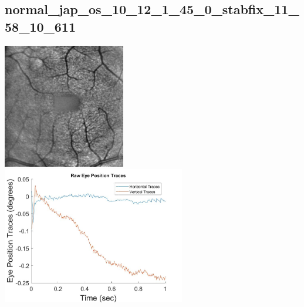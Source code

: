 \documentclass[11pt]{article}
\begin{document}
\subsection{normal\_jap\_os\_10\_12\_1\_45\_0\_stabfix\_11\_58\_10\_611}
\includegraphics[width=0.40\textwidth, valign=m]{referenceframes/tslo_normal/normal_jap_os_10_12_1_45_0_stabfix_11_58_10_611_dwt_nostim_gamscaled_bandfilt_refframe.jpg}
\includegraphics[width=0.60\textwidth, valign=m]{eyepositiontraces/tslo_normal/normal_jap_os_10_12_1_45_0_stabfix_11_58_10_611.jpg}\\
\end{document}
